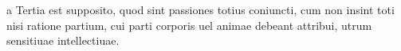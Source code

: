 \documentclass{article}
\begin{document}
\makeatletter


\newcommand{\showwordrank}[2]{#1\ifnumgreater{#2}{0}{\textsuperscript{#2}}{}}

\begin{ledgroup}

\beginnumbering
\pstart

a Tertia est supposito,   quod sint passiones totius coniuncti, cum non insint toti nisi ratione partium, cui parti corporis uel animae debeant attribui,  utrum    sensitiuae 
intellectiuae.
\pend

\endnumbering
\end{ledgroup}


\makeatother
\end{document}
